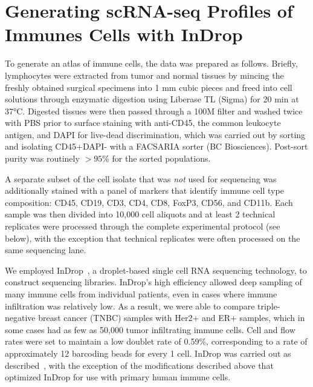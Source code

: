\section{Generating scRNA-seq Profiles of Immunes Cells with InDrop} %

To generate an atlas of immune cells, the data was prepared as follows. 
Briefly, lymphocytes were extracted from tumor and normal tissues by mincing the freshly obtained surgical specimens into 1 mm cubic pieces and freed into cell solutions through enzymatic digestion using Liberase TL (Sigma) for 20 min at 37°C.
Digested tissues were then passed through a 100M filter and washed twice with PBS prior to surface staining with anti-CD45, the common leukocyte antigen, and DAPI for live-dead discrimination, which was carried out by sorting and isolating CD45+DAPI- with a FACSARIA sorter (BC Biosciences).  
Post-sort purity was routinely $>95\%$ for the sorted populations.

A separate subset of the cell isolate that was \textit{not} used for sequencing was additionally stained with a panel of markers that identify immune cell type composition: CD45, CD19, CD3, CD4, CD8, FoxP3, CD56, and CD11b. 
Each sample was then divided into 10,000 cell aliquots and at least 2 technical replicates were processed through the complete experimental protocol (see below), with the exception that technical replicates were often processed on the same sequencing lane. 

We employed InDrop~\citep{Klein2015,Zilionis2017}, a droplet-based single cell RNA sequencing technology, to construct sequencing libraries. 
InDrop's high efficiency allowed deep sampling of many immune cells from individual patients, even in cases where immune infiltration was relatively low.
As a result, we were able to compare triple-negative breast cancer (TNBC) samples with Her2+ and ER+ samples, which in some cases had as few as 50,000 tumor infiltrating immune cells.
Cell and flow rates were set to maintain a low doublet rate of 0.59\%, corresponding to a rate of approximately 12 barcoding beads for every 1 cell. 
InDrop was carried out as described~\citep{Zilionis2017}, with the exception of the modifications described above that optimized InDrop for use with primary human immune cells. 

